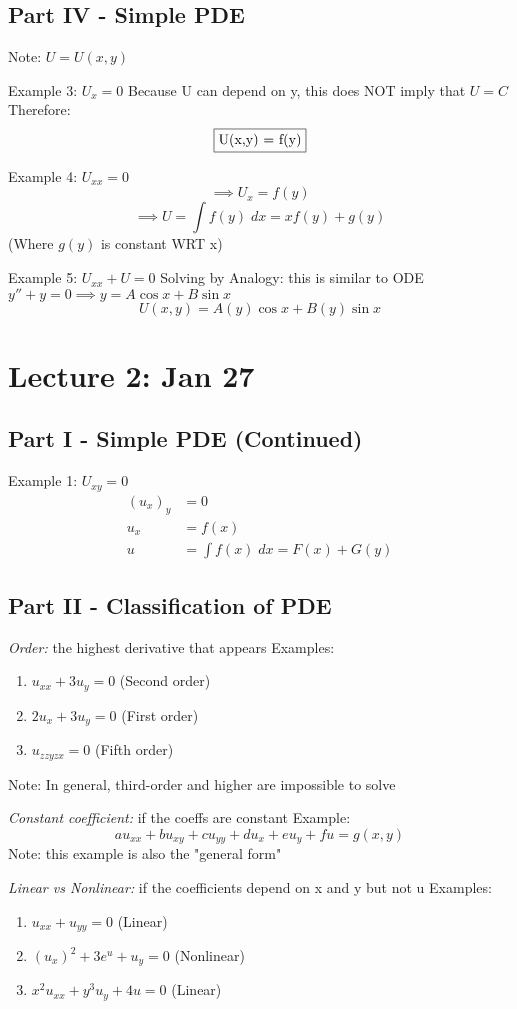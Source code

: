 \documentclass[12pt]{article}
\begin{document}
\subsection*{Part IV - Simple PDE}
Note: $U = U(x, y)$

Example 3: $U_x = 0$
Because U can depend on y, this does NOT imply that $U = C$
Therefore:
\[\boxed{$U(x,y) = f(y)$}\]

Example 4: $U_{xx} = 0$
\[\implies U_x = f(y) \]
\[\implies U = \int f(y)\; dx = \boxed{xf(y) + g(y)}\]
(Where $g(y)$ is constant WRT x)\

Example 5: $U_{xx} + U = 0$
Solving by Analogy: this is similar to ODE $y'' + y = 0 \implies y = A\cos x + B \sin x$
\[\boxed{U(x, y) = A(y)\cos x + B(y)\sin x}\]

\section{Lecture 2: Jan 27}
\subsection*{Part I - Simple PDE (Continued)}
Example 1: $U_{xy} = 0$
\begin{align*}
    (u_x)_y &= 0\\
    u_x &= f(x)\\
    u &= \int f(x) \; dx = \boxed{F(x) + G(y)}
\end{align*}

\subsection*{Part II - Classification of PDE}
\emph{Order:} the highest derivative that appears
Examples:
\begin{enumerate}
    \item $u_{xx} + 3u_y = 0$ \quad (Second order)
    \item $2u_x + 3u_y = 0$ \quad (First order)
    \item $u_{zzyzx} = 0$ \quad (Fifth order)
\end{enumerate}
Note: In general, third-order and higher are impossible to solve 

\emph{Constant coefficient:} if the coeffs are constant
Example:
\[au_{xx} + bu_{xy} + cu_{yy} + du_x + eu_y + fu = g(x, y)\]
Note: this example is also the "general form"

\emph{Linear vs Nonlinear:} if the coefficients depend on x and y but not u 
Examples:
\begin{enumerate}
    \item $u_{xx} + u_{yy} = 0$ \quad (Linear)
    \item $(u_x)^2 + 3e^u + u_y = 0$ \quad (Nonlinear)
    \item $x^2u_{xx} + y^3u_y + 4u = 0$ \quad (Linear)
\end{enumerate}
\end{document}
